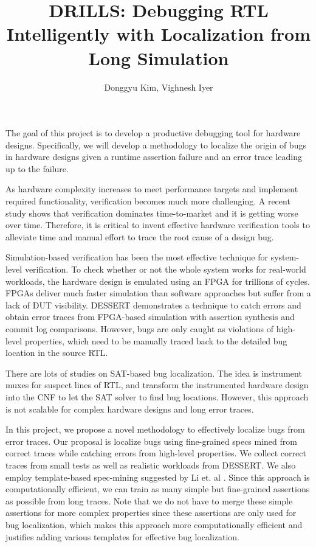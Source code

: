\documentclass[11pt]{article}
\title{DRILLS: Debugging RTL Intelligently with Localization from Long Simulation}
\author{Donggyu Kim, Vighnesh Iyer}
\date{}
\begin{document}
\maketitle

The goal of this project is to develop a productive debugging tool for hardware designs. Specifically, we will develop a methodology to localize the origin of bugs in hardware designs given a runtime assertion failure and an error trace leading up to the failure.

As hardware complexity increases to meet performance targets and implement required functionality, verification becomes much more challenging. A recent study shows that verification dominates time-to-market and it is getting worse over time\supercite{Foster}. Therefore, it is critical to invent effective hardware verification tools to alleviate time and manual effort to trace the root cause of a design bug.

Simulation-based verification has been the most effective technique for system-level verification. To check whether or not the whole system works for real-world workloads, the hardware design is emulated using an FPGA for trillions of cycles. FPGAs deliver much faster simulation than software approaches but suffer from a lack of DUT visibility. DESSERT\supercite{Kim2018} demonstrates a technique to catch errors and obtain error traces from FPGA-based simulation with assertion synthesis and commit log comparisons. However, bugs are only caught as violations of high-level properties, which need to be manually traced back to the detailed bug location in the source RTL.

There are lots of studies on SAT-based bug localization\supercite{Veneris2003}\supercite{Chang2007}\supercite{Mirzaeian}. The idea is instrument muxes for suspect lines of RTL, and transform the instrumented hardware design into the CNF to let the SAT solver to find bug locations. However, this approach is not scalable for complex hardware designs and long error traces.

In this project, we propose a novel methodology to effectively localize bugs from error traces. Our proposal is localize bugs using fine-grained specs mined from correct traces while catching errors from high-level properties. We collect correct traces from small tests as well as realistic workloads from DESSERT. We also employ template-based spec-mining suggested by Li et. al \supercite{Li2010}. Since this approach is computationally efficient, we can train as many simple but fine-grained assertions as possible from long traces. Note that we do not have to merge these simple assertions for more complex properties since these assertions are only used for bug localization, which makes this approach more computationally efficient and justifies adding various templates for effective bug localization.
\end{document}
